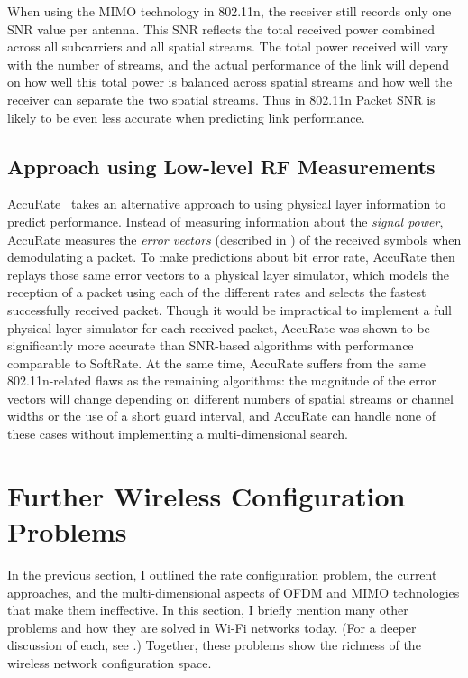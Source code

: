 When using the MIMO technology in 802.11n, the receiver still records only one SNR value per antenna. This SNR reflects the total received power combined across all subcarriers and all spatial streams. The total power received will vary with the number of streams, and the actual performance of the link will depend on how well this total power is balanced across spatial streams and how well the receiver can separate the two spatial streams. Thus in 802.11n Packet SNR is likely to be even less accurate when predicting link performance.

\subsection{Approach using Low-level RF Measurements}
\label{sec:accurate}
AccuRate~\cite{Sen_AccuRate} takes an alternative approach to using physical layer information to predict performance. Instead of measuring information about the \emph{signal power}, AccuRate measures the \emph{error vectors} (described in ) of the received symbols when demodulating a packet. To make predictions about bit error rate, AccuRate then replays those same error vectors to a physical layer simulator, which models the reception of a packet using each of the different rates and selects the fastest successfully received packet. Though it would be impractical to implement a full physical layer simulator for each received packet, AccuRate was shown to be significantly more accurate than SNR-based algorithms with performance comparable to SoftRate. At the same time, AccuRate suffers from the same 802.11n-related flaws as the remaining algorithms: the magnitude of the error vectors will change depending on different numbers of spatial streams or channel widths or the use of a short guard interval, and AccuRate can handle none of these cases without implementing a multi-dimensional search.

\section{Further Wireless Configuration Problems}
\label{sec:problems_11n}
In the previous section, I outlined the rate configuration problem, the current approaches, and the multi-dimensional aspects of OFDM and MIMO technologies that make them ineffective. In this section, I briefly mention many other problems and how they are solved in Wi-Fi networks today. (For a deeper discussion of each, see .) Together, these problems show the richness of the wireless network configuration space.

